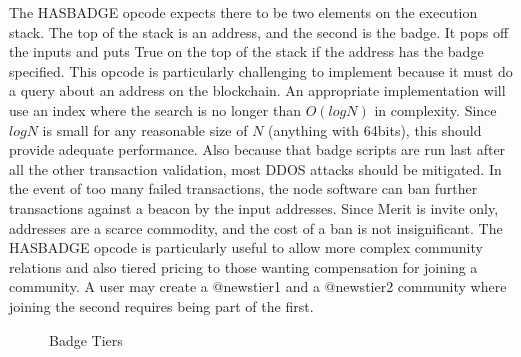 \documentclass{article}
\begin{document}
\begin{center}
\end{center}

The HASBADGE opcode expects there to be two elements on the execution stack. The
top of the stack is an address, and the second is the badge. It pops off the 
inputs and puts True on the top of the stack if the address has the badge specified. This opcode is particularly challenging to implement because it must do a query
about an address on the blockchain. An appropriate implementation will use an
index where the search is no longer than $O(log N)$ in complexity. Since $log N $
is small for any reasonable size of $N$ (anything with 64bits), this should provide
adequate performance. Also because that badge scripts are run last after all 
the other transaction validation, most DDOS \cite{ddos} attacks should be 
mitigated. In the event of too many failed transactions, the node software can
ban further transactions against a beacon by the input addresses. Since Merit
is invite only, addresses are a scarce commodity, and the cost of a ban is not
insignificant.
The HASBADGE opcode is particularly useful to allow more complex community relations and also tiered pricing to those wanting compensation for joining a community.
A user may create a @newstier1 and a @newstier2 community where joining the second
requires being part of the first.

\begin{figure}[H]
    \begin{center}
    \end{center}
    \caption{Badge Tiers}
\end{figure}
\end{document}
